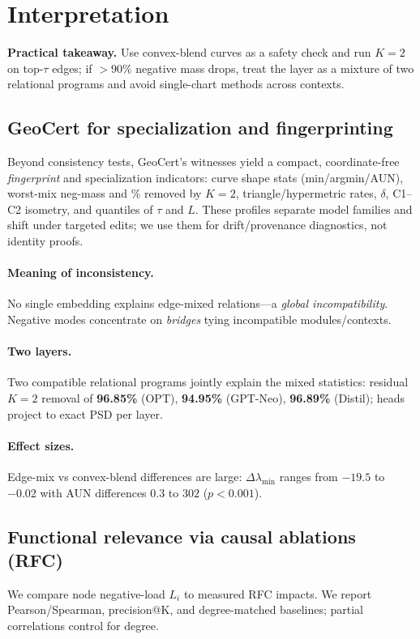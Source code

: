 \documentclass[11pt]{article}
\newcommand{\1}{\mathbf{1}}
\begin{document}
\section{Interpretation}
\textbf{Practical takeaway.} Use convex-blend curves as a safety check and run $K{=}2$ on top-$\tau$ edges; if $>90\%$ negative mass drops, treat the layer as a mixture of two relational programs and avoid single-chart methods across contexts.

\subsection*{GeoCert for specialization and fingerprinting}
Beyond consistency tests, GeoCert's witnesses yield a compact, coordinate-free \emph{fingerprint} and specialization indicators: curve shape stats (min/argmin/AUN), worst-mix neg-mass and \% removed by $K{=}2$, triangle/hypermetric rates, $\delta$, C1--C2 isometry, and quantiles of $\tau$ and $L$. These profiles separate model families and shift under targeted edits; we use them for drift/provenance diagnostics, not identity proofs.

\paragraph{Meaning of inconsistency.} No single embedding explains edge-mixed relations---a \emph{global incompatibility}. Negative modes concentrate on \emph{bridges} tying incompatible modules/contexts.

\paragraph{Two layers.} Two compatible relational programs jointly explain the mixed statistics: residual $K{=}2$ removal of \textbf{96.85\%} (OPT), \textbf{94.95\%} (GPT-Neo), \textbf{96.89\%} (Distil); heads project to exact PSD per layer.

\paragraph{Effect sizes.} Edge-mix vs convex-blend differences are large: $\Delta\lambda_{\min}$ ranges from $-19.5$ to $-0.02$ with AUN differences $0.3$ to $302$ ($p<0.001$).

\subsection{Functional relevance via causal ablations (RFC)}
We compare node negative-load $L_i$ to measured RFC impacts. We report Pearson/Spearman, precision@K, and degree-matched baselines; partial correlations control for degree.
\end{document}
